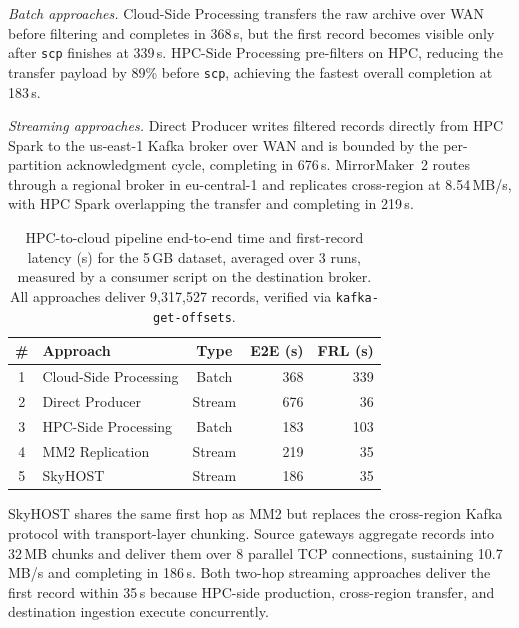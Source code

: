 \documentclass[runningheads]{llncs}
\begin{document}
\textit{Batch approaches.} Cloud-Side Processing transfers the raw archive over WAN before filtering and completes in 368\,s, but the first record becomes visible only after \texttt{scp} finishes at 339\,s. HPC-Side Processing pre-filters on HPC, reducing the transfer payload by 89\% before \texttt{scp}, achieving the fastest overall completion at 183\,s. 



\textit{Streaming approaches.} Direct Producer writes filtered records directly from HPC Spark to the us-east-1 Kafka broker over WAN and is bounded by the per-partition acknowledgment cycle, completing in 676\,s. MirrorMaker~2 routes through a regional broker in eu-central-1 and replicates cross-region at 8.54\,MB/s, with HPC Spark overlapping the transfer and completing in 219\,s. 

\begin{table}[t]
\centering
\caption{HPC-to-cloud pipeline end-to-end time and first-record latency (s) for the 5\,GB dataset, averaged over 3 runs, measured by a consumer script on the destination broker. All approaches deliver 9{,}317{,}527 records, verified via \texttt{kafka-get-offsets}.}
\label{tab:pipeline_results}
\small
\begin{tabular*}{0.65\textwidth}{@{\extracolsep{\fill}}clcrr@{}}
\toprule
\textbf{\#} & \textbf{Approach} & \textbf{Type} & \textbf{E2E (s)} & \textbf{FRL (s)} \\
\midrule
1 & Cloud-Side Processing & Batch   & 368 & 339 \\
2 & Direct Producer       & Stream  & 676 &  36 \\
3 & HPC-Side Processing   & Batch   & 183 & 103 \\
4 & MM2 Replication       & Stream  & 219 &  35 \\
5 & SkyHOST               & Stream  & 186 &  35 \\
\bottomrule
\end{tabular*}
\end{table}



SkyHOST shares the same first hop as MM2 but replaces the cross-region Kafka protocol with transport-layer chunking. Source gateways aggregate records into 32\,MB chunks and deliver them over 8 parallel TCP connections, sustaining 10.7\,MB/s and completing in 186\,s. Both two-hop streaming approaches deliver the first record within 35\,s because HPC-side production, cross-region transfer, and destination ingestion execute concurrently. 
\end{document}
